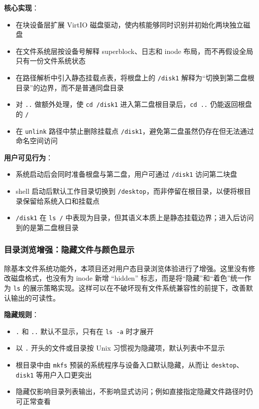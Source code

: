 \documentclass[12pt,a4paper]{ctexart}
\begin{document}
\textbf{核心实现}：
\begin{itemize}
  \item 在块设备层扩展 VirtIO 磁盘驱动，使内核能够同时识别并初始化两块独立磁盘
  \item 在文件系统层按设备号解释 superblock、日志和 inode 布局，而不再假设全局只有一份文件系统状态
  \item 在路径解析中引入静态挂载点表，将根盘上的 \texttt{/disk1} 解释为“切换到第二盘根目录”的边界，而不是普通同盘目录
  \item 对 \texttt{..} 做额外处理，使 \texttt{cd /disk1} 进入第二盘根目录后，\texttt{cd ..} 仍能返回根盘的 \texttt{/}
  \item 在 \texttt{unlink} 路径中禁止删除挂载点 \texttt{/disk1}，避免第二盘虽然仍存在但无法通过命名空间访问
\end{itemize}

\textbf{用户可见行为}：
\begin{itemize}
  \item 系统启动后会同时准备根盘与第二盘，用户可通过 \texttt{/disk1} 访问第二块盘
  \item shell 启动后默认工作目录切换到 \texttt{/desktop}，而非停留在根目录，以便将根目录保留给系统入口和挂载点
  \item \texttt{/disk1} 在 \texttt{ls /} 中表现为目录，但其语义本质上是静态挂载边界；进入后访问到的是第二盘根目录
\end{itemize}

\subsubsection{目录浏览增强：隐藏文件与颜色显示}

除基本文件系统功能外，本项目还对用户态目录浏览体验进行了增强。这里没有修改磁盘格式，也没有为 inode 新增 ``hidden'' 标志，而是将“隐藏”和“着色”统一作为 \texttt{ls} 的展示策略实现。这样可以在不破坏现有文件系统兼容性的前提下，改善默认输出的可读性。

\textbf{隐藏规则}：
\begin{itemize}
  \item \texttt{.} 和 \texttt{..} 默认不显示，只有在 \texttt{ls -a} 时才展开
  \item 以 \texttt{.} 开头的文件或目录按 Unix 习惯视为隐藏项，默认列表中不显示
  \item 根目录中由 \texttt{mkfs} 预装的系统程序与设备入口默认隐藏，从而让 \texttt{desktop}、\texttt{disk1} 等用户入口更突出
  \item 隐藏仅影响目录列表输出，不影响显式访问；例如直接指定隐藏文件路径时仍可正常查看
\end{itemize}
\end{document}
